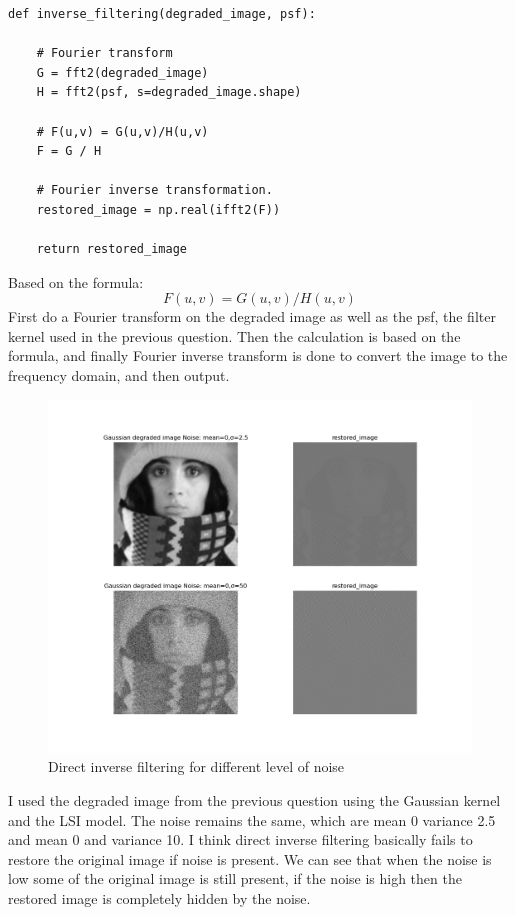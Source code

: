 \documentclass[12pt]{article}
\begin{document}
\subsection{}
\begin{lstlisting}
    
def inverse_filtering(degraded_image, psf):

    # Fourier transform
    G = fft2(degraded_image)
    H = fft2(psf, s=degraded_image.shape)

    # F(u,v) = G(u,v)/H(u,v)
    F = G / H

    # Fourier inverse transformation.
    restored_image = np.real(ifft2(F))

    return restored_image  

\end{lstlisting}

Based on the formula:
\[F(u,v) = G(u,v)/H(u,v)\]
First do a Fourier transform on the degraded image as well as the psf, the filter kernel used in the previous question. Then the calculation is based on the formula, and finally Fourier inverse transform is done to convert the image to the frequency domain, and then output.
\begin{figure}[h]
    \centering
    \includegraphics[width=1\textwidth]{pics/a5_2.2.png} 
    \caption{Direct inverse filtering for different level of noise}
\end{figure}


I used the degraded image from the previous question using the Gaussian kernel and the LSI model. The noise remains the same, which are mean 0 variance 2.5 and mean 0 and variance 10.
I think direct inverse filtering basically fails to restore the original image if noise is present. We can see that when the noise is low some of the original image is still present, if the noise is high then the restored image is completely hidden by the noise.
\end{document}
